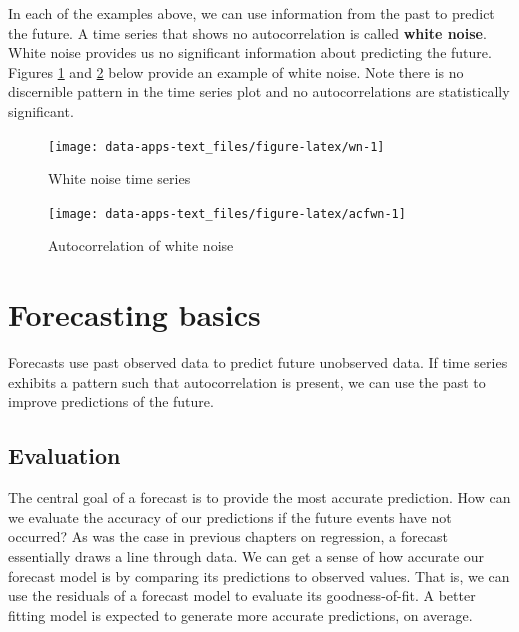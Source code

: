 \documentclass[
]{book}
\begin{document}
In each of the examples above, we can use information from the past to predict the future. A time series that shows no autocorrelation is called \textbf{white noise}. White noise provides us no significant information about predicting the future. Figures \ref{fig:wn} and \ref{fig:acfwn} below provide an example of white noise. Note there is no discernible pattern in the time series plot and no autocorrelations are statistically significant.

\begin{figure}

{\centering \texttt{[image: data-apps-text\_files/figure-latex/wn-1]} 

}

\caption{White noise time series}\label{fig:wn}
\end{figure}

\begin{figure}

{\centering \texttt{[image: data-apps-text\_files/figure-latex/acfwn-1]} 

}

\caption{Autocorrelation of white noise}\label{fig:acfwn}
\end{figure}

\hypertarget{forecasting-basics}{%
\section{Forecasting basics}\label{forecasting-basics}}

Forecasts use past observed data to predict future unobserved data. If time series exhibits a pattern such that autocorrelation is present, we can use the past to improve predictions of the future.

\hypertarget{evaluation}{%
\subsection{Evaluation}\label{evaluation}}

The central goal of a forecast is to provide the most accurate prediction. How can we evaluate the accuracy of our predictions if the future events have not occurred? As was the case in previous chapters on regression, a forecast essentially draws a line through data. We can get a sense of how accurate our forecast model is by comparing its predictions to observed values. That is, we can use the residuals of a forecast model to evaluate its goodness-of-fit. A better fitting model is expected to generate more accurate predictions, on average.
\end{document}
